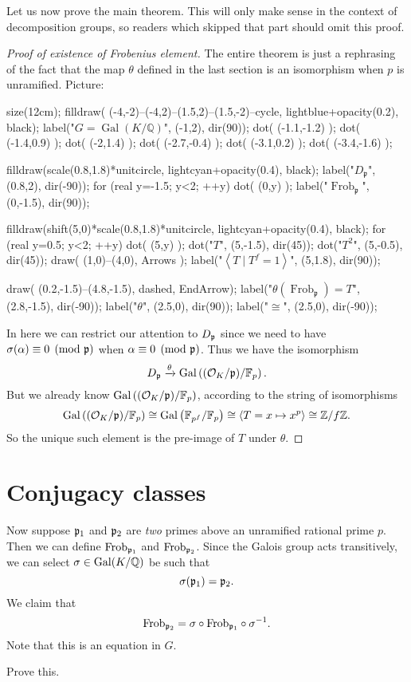 Let us now prove the main theorem.
This will only make sense in the context of decomposition groups,
so readers which skipped that part should omit this proof.
\begin{proof}
	[Proof of existence of Frobenius element]
	The entire theorem is just a rephrasing of the fact
	that the map $\theta$ defined in the last section
	is an isomorphism when $p$ is unramified.
	Picture:
	\begin{center}
		\begin{asy}
			size(12cm);
			filldraw( (-4,-2)--(-4,2)--(1.5,2)--(1.5,-2)--cycle, lightblue+opacity(0.2), black);
			label("$G = \operatorname{Gal}(K/\mathbb Q)$", (-1,2), dir(90));
			dot( (-1.1,-1.2) );
			dot( (-1.4,0.9) );
			dot( (-2,1.4) );
			dot( (-2.7,-0.4) );
			dot( (-3.1,0.2) );
			dot( (-3.4,-1.6) );

			filldraw(scale(0.8,1.8)*unitcircle, lightcyan+opacity(0.4), black);
			label("$D_{\mathfrak p}$", (0.8,2), dir(-90));
			for (real y=-1.5; y<2; ++y) { dot( (0,y) ); }
			label("$\operatorname{Frob}_{\mathfrak p}$", (0,-1.5), dir(90));

			filldraw(shift(5,0)*scale(0.8,1.8)*unitcircle, lightcyan+opacity(0.4), black);
			for (real y=0.5; y<2; ++y) { dot( (5,y) ); }
			dot("$T$", (5,-1.5), dir(45));
			dot("$T^2$", (5,-0.5), dir(45));
			draw( (1,0)--(4,0), Arrows );
			label("$\left<T \mid T^f=1\right>$", (5,1.8), dir(90));

			draw( (0.2,-1.5)--(4.8,-1.5), dashed, EndArrow);
			label("$\theta(\operatorname{Frob}_{\mathfrak p}) = T$", (2.8,-1.5), dir(-90));
			label("$\theta$", (2.5,0), dir(90));
			label("$\cong$", (2.5,0), dir(-90));
		\end{asy}
	\end{center}
	In here we can restrict our attention to $D_\mathfrak p$
	since we need to have $\sigma(\alpha) \equiv 0 \pmod {\mathfrak p}$
	when $\alpha \equiv 0 \pmod {\mathfrak p}$.
	Thus we have the isomorphism
	\[ D_\mathfrak p \xrightarrow{\theta} \operatorname{Gal}\left( (\mathcal O_K/\mathfrak p) / \mathbb F_p \right). \]
	But we already know $\operatorname{Gal}\left( (\mathcal O_K/\mathfrak p)/\mathbb F_p \right)$,
	according to the string of isomorphisms
	\[
		\operatorname{Gal}\left( (\mathcal O_K/\mathfrak p) / \mathbb F_p \right)
		\cong \operatorname{Gal}\left( \mathbb F_{p^f} / \mathbb F_p \right)
		\cong \left< T = x \mapsto x^p \right>
		\cong \mathbb Z/f\mathbb Z .
	\]
	So the unique such element is the pre-image of $T$ under $\theta$.
\end{proof}


\section{Conjugacy classes}
Now suppose $\mathfrak p_1$ and $\mathfrak p_2$ are \emph{two} primes above an unramified rational prime $p$.
Then we can define $\mathrm{Frob}_{\mathfrak p_1}$ and $\mathrm{Frob}_{\mathfrak p_2}$.
Since the Galois group acts transitively,
we can select $\sigma \in \operatorname{Gal}(K/\mathbb Q)$ be such that
\[ \sigma(\mathfrak p_1) = \mathfrak p_2. \]
We claim that
\[
	\mathrm{Frob}_{\mathfrak p_2} = \sigma \circ \mathrm{Frob}_{\mathfrak p_1} \circ \sigma^{-1}.
\]
Note that this is an equation in $G$.
\begin{ques}
	Prove this.
\end{ques}

